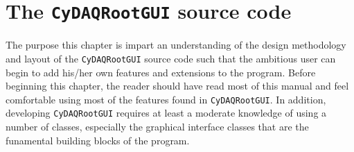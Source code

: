 \chapter{The \texttt{CyDAQRootGUI} source code}
\label{chap:source}
The purpose this chapter is impart an understanding of the design
methodology and layout of the \texttt{CyDAQRootGUI} source code such
that the ambitious user can begin to add his/her own features and
extensions to the program. Before beginning this chapter, the reader
should have read most of this manual and feel comfortable using most
of the features found in \texttt{CyDAQRootGUI}. In addition,
developing \texttt{CyDAQRootGUI} requires at least a moderate
knowledge of using a number of \ROOT classes, especially the \ROOT
graphical interface classes that are the funamental building blocks of
the program.








